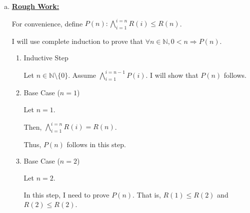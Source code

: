 \documentclass[12pt]{article}
\begin{document}
\begin{enumerate}[a.]

    \item

    \bigskip

    \begin{mdframed}
        \underline{\textbf{Rough Work:}}

        \bigskip

        For convenience, define $P(n): \bigwedge\limits_{i=1}^{i=n} R(i) \leq R(n)$.

        \bigskip

        I will use complete induction to prove that $\forall n \in \mathbb{N},
        0 < n \Rightarrow P(n)$.

        \bigskip

        \begin{enumerate}[1.]
            \item Inductive Step

            \begin{mdframed}
            Let $n \in \mathbb{N} \setminus \{0\}$. Assume $\bigwedge\limits_{i=1}^{i=n-1} P(i)$.
            I will show that $P(n)$ follows.
            \end{mdframed}

            \item Base Case ($n = 1$)

            \begin{mdframed}
            Let $n = 1$.

            \bigskip

            Then, $\bigwedge\limits_{i=1}^{i=n} R(i) = R(n)$.

            \bigskip

            Thus, $P(n)$ follows in this step.

            \end{mdframed}

            \item Base Case ($n = 2$)

            \begin{mdframed}
            Let $n = 2$.

            \bigskip

            In this step, I need to prove $P(n)$. That is, $R(1) \leq R(2)$ and
            $R(2) \leq R(2)$.


\end{mdframed}
\end{enumerate}
\end{mdframed}
\end{enumerate}
\end{document}
